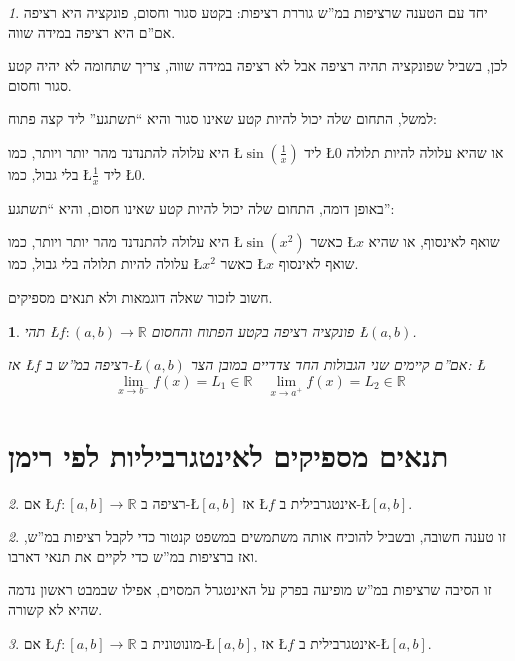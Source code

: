 \documentclass[english,hebrew]{article}
\theoremstyle{remark}
\newtheorem*{rem*}{\protect\remarkname}
\theoremstyle{definition}
\theoremstyle{plain}
\newtheorem{thm}{\protect\theoremname}
\theoremstyle{remark}
\newtheorem{claim}[thm]{\protect\claimname}
\theoremstyle{plain}
\theoremstyle{plain}
\theoremstyle{definition}
\theoremstyle{plain}
\providecommand{\claimname}{טענה}
\providecommand{\remarkname}{הערה}
\providecommand{\theoremname}{משפט}
\begin{document}
\begin{rem*}
יחד עם הטענה שרציפות במ\textquotedblright ש גוררת רציפות: בקטע סגור
וחסום, פונקציה היא רציפה אם\textquotedblright ם היא רציפה במידה שווה.

לכן, בשביל שפונקציה תהיה רציפה אבל לא רציפה במידה שווה, צריך שתחומה
לא יהיה קטע סגור וחסום.

למשל, התחום שלה יכול להיות קטע שאינו סגור והיא \textquotedblleft תשתגע\textquotedblright{}
ליד קצה פתוח:

היא עלולה להתנדנד מהר יותר ויותר, כמו \L{$\sin\left(\frac{1}{x}\right)$}
ליד \L{$0$} או שהיא עלולה להיות תלולה בלי גבול, כמו \L{$\frac{1}{x}$}
ליד \L{$0$}.

באופן דומה, התחום שלה יכול להיות קטע שאינו חסום, והיא \textquotedblleft תשתגע\textquotedblright :

היא עלולה להתנדנד מהר יותר ויותר, כמו \L{$\sin\left(x^{2}\right)$}
כאשר \L{$x$} שואף לאינסוף, או שהיא עלולה להיות תלולה בלי גבול, כמו
\L{$x^{2}$} כאשר \L{$x$} שואף לאינסוף.

חשוב לזכור שאלה דוגמאות ולא תנאים מספיקים.
\end{rem*}
\begin{thm}
תהי \L{$f:\left(a,b\right)\rightarrow\mathbb{R}$} פונקציה רציפה בקטע
הפתוח והחסום \L{$\left(a,b\right)$}.

אז \L{$f$} רציפה במ\textquotedblright ש ב-\L{$\left(a,b\right)$}
אם\textquotedblright ם קיימים שני הגבולות החד צדדיים במובן הצר: \L{%
\[
\underset{x\rightarrow b^{-}}{\lim}f(x)=L_{1}\in\mathbb{R}\quad\underset{x\rightarrow a^{+}}{\lim}f(x)=L_{2}\in\mathbb{R}
\]
}%
\end{thm}

\part{תנאים מספיקים לאינטגרביליות לפי רימן}
\begin{claim}
\label{claim:continuous-integrable}אם \L{$f:\left[a,b\right]\rightarrow\mathbb{R}$}
רציפה ב-\L{$\left[a,b\right]$} אז \L{$f$} אינטגרבילית ב-\L{$\left[a,b\right]$}.
\end{claim}

\begin{rem*}
זו טענה חשובה, ובשביל להוכיח אותה משתמשים במשפט קנטור כדי לקבל רציפות
במ\textquotedblright ש, ואז ברציפות במ\textquotedblright ש כדי לקיים
את תנאי דארבו.

זו הסיבה שרציפות במ\textquotedblright ש מופיעה בפרק על האינטגרל המסוים,
אפילו שבמבט ראשון נדמה שהיא לא קשורה.
\end{rem*}
\begin{claim}
אם \L{$f:\left[a,b\right]\rightarrow\mathbb{R}$} מונוטונית ב-\L{$\left[a,b\right]$},
אז \L{$f$} אינטגרבילית ב-\L{$\left[a,b\right]$}.
\end{claim}
\end{document}
